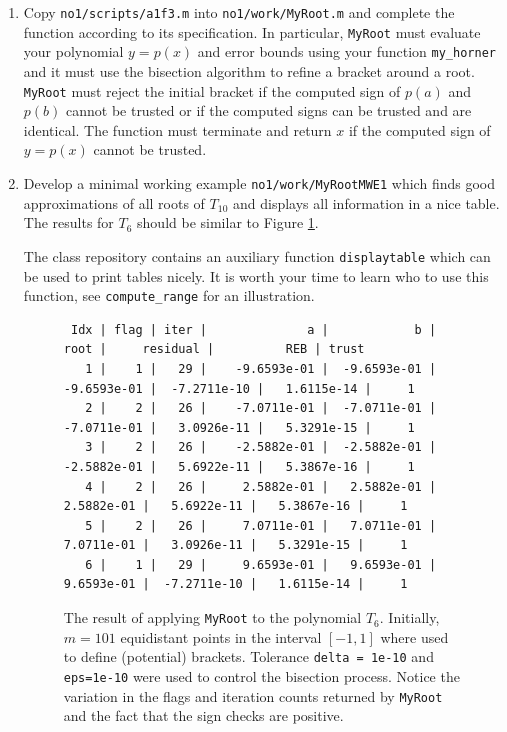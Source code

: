 \documentclass[a4paper,12pt]{article}
\newcounter{hint}
\newenvironment{hint}{\refstepcounter{hint} \vspace{0.1cm} \par \noindent {\bf Hint \arabic{hint}}}{\vspace{0.3cm}}
\begin{document}
\begin{enumerate}
\item Copy {\tt no1/scripts/a1f3.m} into {\tt no1/work/MyRoot.m} and complete the function according to its specification. In particular, {\tt MyRoot} must evaluate your polynomial $y=p(x)$ and error bounds using your function {\tt my\_horner} and it must use the bisection algorithm to refine a bracket around a root. {\tt MyRoot} must reject the initial bracket if the computed sign of $p(a)$ and $p(b)$ cannot be trusted or if the computed signs can be trusted and are identical. The function must terminate and return $x$ if the computed sign of $y=p(x)$ cannot be trusted.
\item Develop a minimal working example {\tt no1/work/MyRootMWE1} which finds good approximations of all roots of $T_{10}$ and displays all information in a nice table. The results for $T_6$ should be similar to Figure \ref{fig:MyRootMWE6}.

  \begin{hint} The class repository contains an auxiliary function {\tt displaytable} which can be used to print tables nicely. It is worth your time to learn who to use this function, see {\tt compute\_range} for an illustration.
\end{hint}

\begin{landscape}
\begin{figure}
  \begin{verbatim}
 Idx | flag | iter |              a |            b |         root |     residual |          REB | trust
   1 |    1 |   29 |    -9.6593e-01 |  -9.6593e-01 |  -9.6593e-01 |  -7.2711e-10 |   1.6115e-14 |     1
   2 |    2 |   26 |    -7.0711e-01 |  -7.0711e-01 |  -7.0711e-01 |   3.0926e-11 |   5.3291e-15 |     1
   3 |    2 |   26 |    -2.5882e-01 |  -2.5882e-01 |  -2.5882e-01 |   5.6922e-11 |   5.3867e-16 |     1
   4 |    2 |   26 |     2.5882e-01 |   2.5882e-01 |   2.5882e-01 |   5.6922e-11 |   5.3867e-16 |     1
   5 |    2 |   26 |     7.0711e-01 |   7.0711e-01 |   7.0711e-01 |   3.0926e-11 |   5.3291e-15 |     1
   6 |    1 |   29 |     9.6593e-01 |   9.6593e-01 |   9.6593e-01 |  -7.2711e-10 |   1.6115e-14 |     1
\end{verbatim} \caption[Root finding for $T_6$.]{The result of applying {\tt MyRoot} to the polynomial $T_6$. Initially, $m=101$ equidistant points in the interval $[-1,1]$ where used to define (potential) brackets. Tolerance {\tt delta = 1e-10} and {\tt eps=1e-10} were used to control the bisection process. Notice the variation in the flags and iteration counts returned by {\tt MyRoot} and the fact that the sign checks are positive.} \label{fig:MyRootMWE6}
  \end{figure}
\end{landscape}



\end{enumerate}
\end{document}
